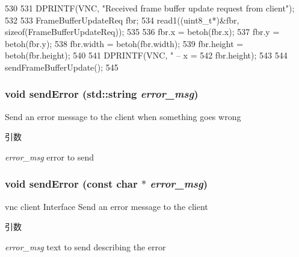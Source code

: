 \begin{DoxyCode}
530 {
531     DPRINTF(VNC, "Received frame buffer update request from client\n");
532 
533     FrameBufferUpdateReq fbr;
534     read1((uint8_t*)&fbr, sizeof(FrameBufferUpdateReq));
535 
536     fbr.x = betoh(fbr.x);
537     fbr.y = betoh(fbr.y);
538     fbr.width = betoh(fbr.width);
539     fbr.height = betoh(fbr.height);
540 
541     DPRINTF(VNC, " -- x = %
542             fbr.height);
543 
544     sendFrameBufferUpdate();
545 }
\end{DoxyCode}
\hypertarget{classVncServer_a6ad4e22608f77193eb9cddb1c8b20703}{
\subsubsection[{sendError}]{\setlength{\rightskip}{0pt plus 5cm}void sendError (std::string {\em error\_\-msg})}}
\label{classVncServer_a6ad4e22608f77193eb9cddb1c8b20703}
Send an error message to the client when something goes wrong 
\begin{DoxyParams}{引数}
\item[{\em error\_\-msg}]error to send \end{DoxyParams}
\hypertarget{classVncServer_a3531045d065c2aa1aaf5a225e2337e80}{
\subsubsection[{sendError}]{\setlength{\rightskip}{0pt plus 5cm}void sendError (const char $\ast$ {\em error\_\-msg})}}
\label{classVncServer_a3531045d065c2aa1aaf5a225e2337e80}
vnc client Interface Send an error message to the client 
\begin{DoxyParams}{引数}
\item[{\em error\_\-msg}]text to send describing the error \end{DoxyParams}



